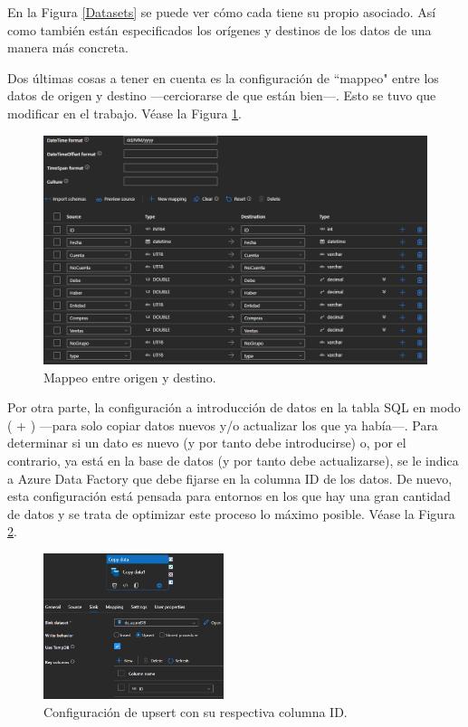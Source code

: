 En la Figura \ref{Datasets} se puede ver cómo cada  tiene su propio  asociado. Así como también están especificados los orígenes y destinos de los datos de una manera más concreta.

Dos últimas cosas a tener en cuenta es la configuración de ``mappeo" entre los datos de origen y destino ---cerciorarse de que están bien---. Esto se tuvo que modificar en el trabajo. Véase la Figura \ref{mappeo}.

\begin{figure}[H]
	\centering
		\includegraphics[scale = 0.4]{imgs/dataFactoryconf2.png}
	\caption{Mappeo entre origen y destino.}
	\label{mappeo}
\end{figure}


Por otra parte, la configuración a introducción de datos en la tabla SQL en modo  ( + ) ---para solo copiar datos nuevos y/o actualizar los que ya había---. Para determinar si un dato es nuevo (y por tanto debe introducirse) o, por el contrario, ya está en la base de datos (y por tanto debe actualizarse), se le indica a Azure Data Factory que debe fijarse en la columna ID de los datos. De nuevo, esta configuración está pensada para entornos  en los que hay una gran cantidad de datos y se trata de optimizar este proceso lo máximo posible. Véase la Figura \ref{dataFactoryconf}.

\begin{figure}[H]
	\centering
	\includegraphics[width = 0.47\textwidth]{imgs/dataFactoryconf1.png}
	\caption{Configuración de upsert con su respectiva columna ID.}
	\label{dataFactoryconf}
\end{figure}

